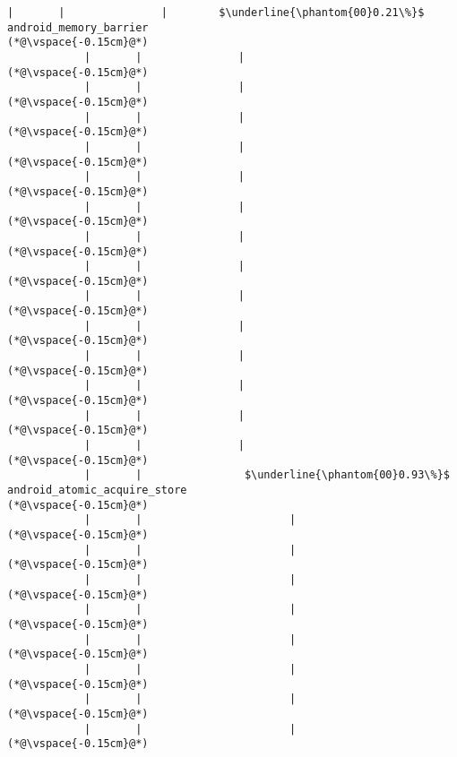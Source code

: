 \begin{lstlisting}[caption=Staattinen metodi Java$\to$C , label=profile:J2CBenchmark00001, numberbychapter=true, frame=lines, float, floatplacement=t]
            |       |               |        $\underline{\phantom{00}0.21\%}$ android_memory_barrier
(*@\vspace{-0.15cm}@*)
            |       |               |
(*@\vspace{-0.15cm}@*)
            |       |               |
(*@\vspace{-0.15cm}@*)
            |       |               |
(*@\vspace{-0.15cm}@*)
            |       |               |
(*@\vspace{-0.15cm}@*)
            |       |               |
(*@\vspace{-0.15cm}@*)
            |       |               |
(*@\vspace{-0.15cm}@*)
            |       |               |
(*@\vspace{-0.15cm}@*)
            |       |               |
(*@\vspace{-0.15cm}@*)
            |       |               |
(*@\vspace{-0.15cm}@*)
            |       |               |
(*@\vspace{-0.15cm}@*)
            |       |               |
(*@\vspace{-0.15cm}@*)
            |       |               |
(*@\vspace{-0.15cm}@*)
            |       |               |
(*@\vspace{-0.15cm}@*)
            |       |               |
(*@\vspace{-0.15cm}@*)
            |       |                $\underline{\phantom{00}0.93\%}$ android_atomic_acquire_store
(*@\vspace{-0.15cm}@*)
            |       |                       |
(*@\vspace{-0.15cm}@*)
            |       |                       |
(*@\vspace{-0.15cm}@*)
            |       |                       |
(*@\vspace{-0.15cm}@*)
            |       |                       |
(*@\vspace{-0.15cm}@*)
            |       |                       |
(*@\vspace{-0.15cm}@*)
            |       |                       |
(*@\vspace{-0.15cm}@*)
            |       |                       |
(*@\vspace{-0.15cm}@*)
            |       |                       |
(*@\vspace{-0.15cm}@*)

\end{lstlisting}

